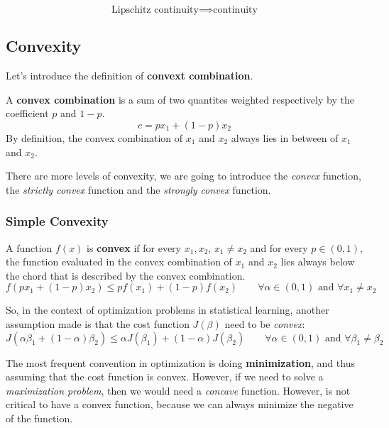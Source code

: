 \begin{theorem}
    \[
        \text{Lipschitz continuity} \implies \text{continuity}
    \]
\end{theorem}
\subsection{Convexity}
Let's introduce the definition of \textbf{convext combination}.
\begin{definition}
    A \textbf{convex combination} is a sum of two quantites weighted respectively by the coefficient $p$ and $1-p$.
    \[
        c = p x_1 + (1-p) x_2
    \]
    By definition, the convex combination of $x_1$ and $x_2$ always lies in between of $x_1$ and $x_2$.
\end{definition}

There are more levels of convexity, we are going to introduce the \textit{convex} function, the \textit{strictly convex} function and the \textit{strongly convex} function.
\subsubsection*{Simple Convexity}

\begin{definition}
    A function $f(x)$ is \textbf{convex} if for every $x_1, x_2$, $x_1 \neq x_2$ and for every $p \in (0,1)$, the function evaluated in the convex combination of $x_1$ and $x_2$ lies always below the chord that is described by the convex combination.
    \[
        f(p x_1 + (1-p) x_2) \leq p f(x_1) + (1-p) f(x_2) \qquad \forall \alpha \in (0,1) \text{ and } \forall x_1 \neq x_2
    \]
\end{definition}

So, in the context of optimization problems in statistical learning, another assumption made is that the cost function $J(\beta)$ need to be \textit{convex}:
\[
    J(\alpha \beta_1 + (1-\alpha)\beta_2) \leq \alpha J(\beta_1) + (1-\alpha)J(\beta_2) \qquad  \forall \alpha \in (0,1) \text{ and } \forall \beta_1 \neq \beta_2
\]

The most frequent convention in optimization is doing \textbf{minimization}, and thus assuming that the cost function is convex. However, if we need to solve a \textit{maximization problem}, then we would need a \textit{concave} function.
However, is not critical to have a convex function, because we can always minimize the negative of the function.

